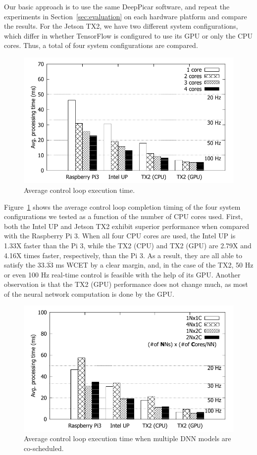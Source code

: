 Our basic approach is to use the same DeepPicar software, and repeat
the experiments in Section~\ref{sec:evaluation} on each hardware
platform and compare the results. 
For the Jetson TX2, we have two different system configurations,
which differ in whether TensorFlow is configured to use its GPU or
only the CPU cores. Thus, a total of four system configurations are
compared.

\begin{figure}[h]
  \centering
  \includegraphics[width=.45\textwidth]{figs/compare_core}
  \caption{Average control loop execution time.} 
  \label{fig:sys_core}
\end{figure}

Figure~\ref{fig:sys_core} shows the average control loop completion
timing of the four system configurations we tested as a function of
the number of CPU cores used.
First, both the Intel UP and Jetson TX2 exhibit superior performance when
compared with the Raspberry Pi 3. 
When all four CPU cores are used, the Intel UP is 1.33X faster than
the Pi 3, while the TX2 (CPU) and TX2 (GPU) are 2.79X and 4.16X times faster,
respectively, than the Pi 3. 
As a result, they are all able to satisfy the 33.$\overline{\mbox{33}}$ ms 
WCET by a clear margin,
and, in the case of the TX2, 50 Hz or even 100 Hz real-time control is
feasible with the help of its GPU. Another observation is that the TX2
(GPU) performance does not change much, as most of the neural network 
computation is done by the GPU.

\begin{figure}[h]
  \centering
  \includegraphics[width=.45\textwidth]{figs/compare_model}
  \caption{Average control loop execution time when multiple DNN
    models are co-scheduled. }
  \label{fig:sys_model}
\end{figure}

